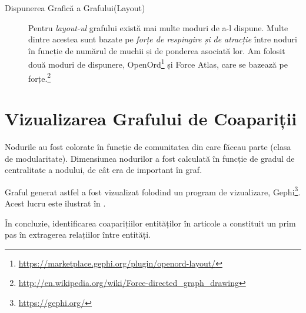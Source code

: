 \begin{description}
 
 \item[Dispunerea Grafică a Grafului(Layout)] Pentru \textit{layout-ul} grafului există mai multe moduri de a-l dispune. Multe dintre acestea sunt bazate pe \textit{forțe de respingire și de atracție} între noduri în funcție de numărul de muchii și de ponderea asociată lor. Am folosit două moduri de dispunere, OpenOrd\footnote{\url{https://marketplace.gephi.org/plugin/openord-layout/}} și Force Atlas, care se bazează pe forțe.\footnote{\url{http://en.wikipedia.org/wiki/Force-directed_graph_drawing}}
\end{description}

 
\section{Vizualizarea Grafului de Coapariții}

Nodurile au fost colorate în funcție de comunitatea din care făceau parte (clasa de modularitate). Dimensiunea nodurilor a fost calculată în funcție de gradul de centralitate a nodului, de cât era de important în graf.

Graful generat astfel a fost vizualizat folodind un program de vizualizare, Gephi\footnote{\url{https://gephi.org/}}. Acest lucru este ilustrat în .



În concluzie, identificarea coaparițiilor entităților în articole a constituit un prim pas în extragerea relațiilor între entități.

